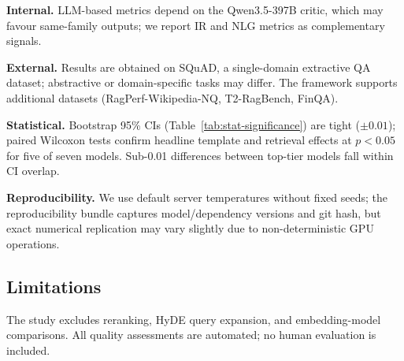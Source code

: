 \textbf{Internal.} LLM-based metrics depend on the Qwen3.5-397B critic, which may favour same-family outputs; we report IR and NLG metrics as complementary signals.

\textbf{External.} Results are obtained on SQuAD, a single-domain extractive QA dataset; abstractive or domain-specific tasks may differ. The framework supports additional datasets (RagPerf-Wikipedia-NQ, T2-RagBench, FinQA).

\textbf{Statistical.} Bootstrap 95\% CIs (Table~\ref{tab:stat-significance}) are tight ($\pm 0.01$); paired Wilcoxon tests confirm headline template and retrieval effects at $p<0.05$ for five of seven models. Sub-0.01 differences between top-tier models fall within CI overlap.

\textbf{Reproducibility.} We use default server temperatures without fixed seeds; the reproducibility bundle captures model/dependency versions and git hash, but exact numerical replication may vary slightly due to non-deterministic GPU operations.

\subsection{Limitations}

The study excludes reranking, HyDE query expansion, and embedding-model comparisons. All quality assessments are automated; no human evaluation is included.
